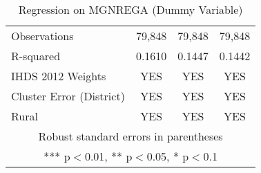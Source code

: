 \documentclass{article}
\begin{document}
\begin{table}[]
\begin{tabular}{lccc}
 \hline 
Observations & 79,848 & 79,848 & 79,848 \\
 R-squared & 0.1610 & 0.1447 & 0.1442 \\ 
IHDS 2012 Weights & YES & YES & YES \\
Cluster Error (District) & YES & YES & YES \\
Rural & YES & YES & YES \\\hline
\multicolumn{4}{c}{ Robust standard errors in parentheses} \\
\multicolumn{4}{c}{ *** p$<$0.01, ** p$<$0.05, * p$<$0.1} \\ \hline
\end{tabular}
    \caption{Regression on MGNREGA (Dummy Variable)}
    \label{tab2}
\end{table}


\begin{table}[]
\small


\end{table}
\end{document}
